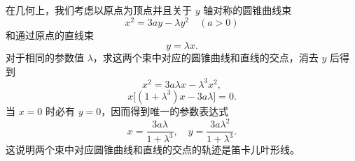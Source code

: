 \medskip
\noindent
在几何上，我们考虑以原点为顶点并且关于 $y$ 轴对称的圆锥曲线束
\[
  x^2 = 3ay - \lambda y^2 \quad (a>0)
\]
和通过原点的直线束
\[
  y = \lambda x.
\]
对于相同的参数值 $\lambda$，求这两个束中对应的圆锥曲线和直线的交点，消去 $y$ 后得到
\[
  x^2 = 3a\lambda x - \lambda^3 x^2,
\]
\[
  x\bigl[(1+\lambda^3)x - 3a\lambda\bigr] = 0.
\]
当 $x=0$ 时必有 $y=0$，因而得到唯一的参数表达式
\[
  x = \frac{3a\lambda}{1+\lambda^3},\quad y = \frac{3a\lambda^2}{1+\lambda^3}.
\]
这说明两个束中对应圆锥曲线和直线的交点的轨迹是笛卡儿叶形线。
